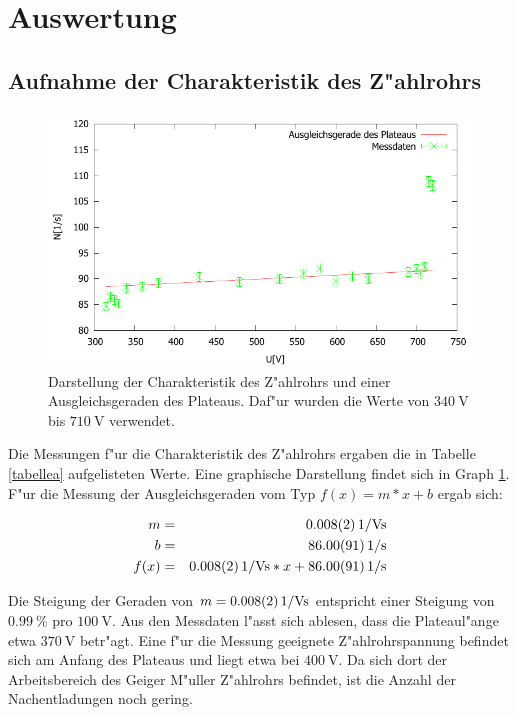 \section{Auswertung}
	\label{sec:auswertung}

	\subsection{Aufnahme der Charakteristik des Z"ahlrohrs} %
	\label{sub:z_ahlrohr_charakteristik}

	

	\begin{figure}[!h]
		\centering	
		\includegraphics[width = 16cm]{img/charakteristik.pdf}
		\caption{Darstellung der Charakteristik des Z"ahlrohrs und einer Ausgleichsgeraden des Plateaus. Daf"ur wurden die Werte von $\SI{340}{\volt}$ bis $\SI{710}{\volt}$ verwendet.}
		\label{charakteristik}
	\end{figure}

	Die Messungen f"ur die Charakteristik des Z"ahlrohrs ergaben die in Tabelle \ref{tabellea} aufgelisteten Werte. Eine graphische Darstellung findet sich in Graph \ref{charakteristik}.
	F"ur die Messung der Ausgleichsgeraden vom Typ $f(x) = m*x+b$ ergab sich:

	\begin{eqnarray*}
		m &=& \SI{0.008 (2)}{1\per\volt\second}\\
		b &=& \SI{86.00 (91)}{1\per\second}\\
		f(x) &=& \SI{0.008 (2)}{1\per\volt\second} * x + \SI{86.00 (91)}{1\per\second}
	\end{eqnarray*}

	Die Steigung der Geraden von $m = \SI{0.008 (2)}{1\per\volt\second}$ entspricht einer Steigung von $\SI{0.99}{\%}$ pro $\SI{100}{\volt}$.
	Aus den Messdaten l"asst sich ablesen, dass die Plateaul"ange etwa $\SI{370}{\volt}$ betr"agt.
	Eine f"ur die Messung geeignete Z"ahlrohrspannung befindet sich am Anfang des Plateaus und liegt etwa bei $\SI{400}{\volt}$. Da sich dort der Arbeitsbereich des Geiger M"uller Z"ahlrohrs befindet, ist die Anzahl der Nachentladungen noch gering.

